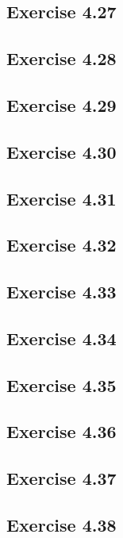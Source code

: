 \documentclass[../Marcus.tex]{subfiles}
\begin{document}
\subsection*{Exercise 4.27}

\subsection*{Exercise 4.28}

\subsection*{Exercise 4.29}

\subsection*{Exercise 4.30}

\subsection*{Exercise 4.31}

\subsection*{Exercise 4.32}

\subsection*{Exercise 4.33}

\subsection*{Exercise 4.34}

\subsection*{Exercise 4.35}

\subsection*{Exercise 4.36}

\subsection*{Exercise 4.37}

\subsection*{Exercise 4.38}
\phantom{}
\end{document}
